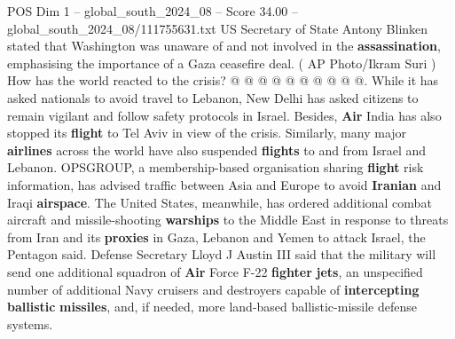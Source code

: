 \begin{textsample}{POS Dim 1 – global\_south\_2024\_08 – Score 34.00 – global\_south\_2024\_08/111755631.txt}
US Secretary of State Antony Blinken stated that Washington was unaware of and not involved in the \textbf{assassination}, emphasising the importance of a Gaza ceasefire deal. ( AP Photo/Ikram Suri ) How has the world reacted to the crisis? @ @ @ @ @ @ @ @ @ @.
While it has asked nationals to avoid travel to Lebanon, New Delhi has asked citizens to remain vigilant and follow safety protocols in Israel.
Besides, \textbf{Air} India has also stopped its \textbf{flight} to Tel Aviv in view of the crisis.
Similarly, many major \textbf{airlines} across the world have also suspended \textbf{flights} to and from Israel and Lebanon.
OPSGROUP, a membership-based organisation sharing \textbf{flight} risk information, has advised traffic between Asia and Europe to avoid \textbf{Iranian} and Iraqi \textbf{airspace}.
The United States, meanwhile, has ordered additional combat aircraft and missile-shooting \textbf{warships} to the Middle East in response to threats from Iran and its \textbf{proxies} in Gaza, Lebanon and Yemen to attack Israel, the Pentagon said.
Defense Secretary Lloyd J Austin III said that the military will send one additional squadron of \textbf{Air} Force F-22 \textbf{fighter} \textbf{jets}, an unspecified number of additional Navy cruisers and destroyers capable of \textbf{intercepting} \textbf{ballistic} \textbf{missiles}, and, if needed, more land-based ballistic-missile defense systems.

\end{textsample}
